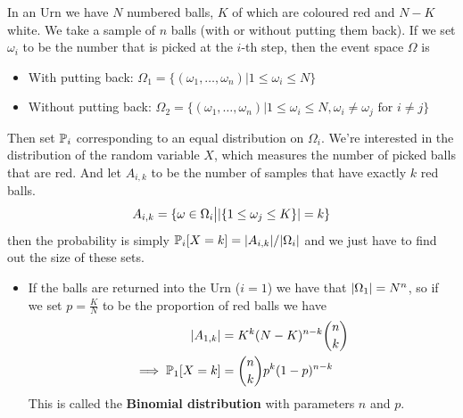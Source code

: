 \begin{ex}
In an Urn we have $N$ numbered balls, $K$ of which are coloured red and $N-K$ white.
We take a sample of $n$ balls (with or without putting them back).
If we set $\omega_i$ to be the number that is picked at the $i$-th step, then the event space $\Omega$ is
\begin{itemize}
  \item With putting back: $\Omega_1 = \{(\omega_1, \ldots,\omega_n) \big\vert 1 \leq \omega_i \leq N\}$
  \item Without putting back: $\Omega_2 = \{(\omega_1, \ldots,\omega_n) \big\vert 1 \leq \omega_i \leq N, \omega_i \neq \omega_j  \text{ for } i \neq j\}$
\end{itemize}
Then set $\mathbb{P}_i$ corresponding to an equal distribution on $\Omega_i$. We're interested in the distribution of the random variable $X$, which measures the number of picked balls that are red.
And let $A_{i,k}$ to be the number of samples that have exactly $k$ red balls.
\begin{align*}
  A_{i,k} = \{\omega \in  \Omega_i \big\vert \vert\{1 \leq \omega_j \leq K\}\vert = k\}
\end{align*}
then the probability is simply $\mathbb{P}_i[X = k] = \vert A_{i,k}\vert/\vert\Omega_i\vert$ and we just have to find out the size of these sets.
\begin{itemize}
  \item If the balls are returned into the Urn ($i=1$) we have that $\vert\Omega_1\vert = N^{n}$, so if we set $p = \frac{K}{N}$ to be the proportion of red balls we have
    \begin{align*}
      \vert A_{1,k}\vert &= K^{k}(N-K)^{n-k} \binom{n}{k}\\
      \implies \mathbb{P}_1[X = k] &= \binom{n}{k} p^{k}(1 - p)^{n-k}
    \end{align*}
    This is called the \textbf{Binomial distribution} with parameters $n$ and $p$.


\end{itemize}
\end{ex}
